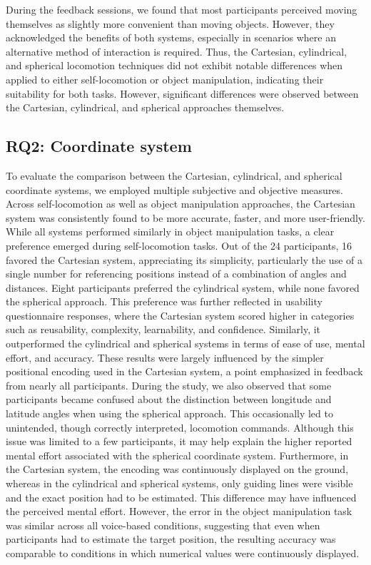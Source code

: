 \documentclass[preprint,12pt]{elsarticle}
\newcommand{\reftext}[1]{{\color{gray}#1}}   %
\begin{document}
\reftext{During the feedback sessions, we found that most participants perceived moving themselves as slightly more convenient than moving objects. However, they acknowledged the benefits of both systems, especially in scenarios where an alternative method of interaction is required. Thus, the Cartesian, cylindrical, and spherical locomotion techniques did not exhibit notable differences when applied to either self-locomotion or object manipulation, indicating their suitability for both tasks. However, significant differences were observed between the Cartesian, cylindrical, and spherical approaches themselves.}

\subsection{RQ2: Coordinate system}
\reftext{To evaluate the comparison between the Cartesian, cylindrical, and spherical coordinate systems, we employed multiple subjective and objective measures. Across self-locomotion as well as object manipulation approaches, the Cartesian system was consistently found to be more accurate, faster, and more user-friendly. While all systems performed similarly in object manipulation tasks, a clear preference emerged during self-locomotion tasks. Out of the 24 participants, 16 favored the Cartesian system, appreciating its simplicity, particularly the use of a single number for referencing positions instead of a combination of angles and distances. Eight participants preferred the cylindrical system, while none favored the spherical approach. This preference was further reflected in usability questionnaire responses, where the Cartesian system scored higher in categories such as reusability, complexity, learnability, and confidence. Similarly, it outperformed the cylindrical and spherical systems in terms of ease of use, mental effort, and accuracy. These results were largely influenced by the simpler positional encoding used in the Cartesian system, a point emphasized in feedback from nearly all participants. During the study, we also observed that some participants became confused about the distinction between longitude and latitude angles when using the spherical approach. This occasionally led to unintended, though correctly interpreted, locomotion commands. Although this issue was limited to a few participants, it may help explain the higher reported mental effort associated with the spherical coordinate system. Furthermore, in the Cartesian system, the encoding was continuously displayed on the ground, whereas in the cylindrical and spherical systems, only guiding lines were visible and the exact position had to be estimated. This difference may have influenced the perceived mental effort. However, the error in the object manipulation task was similar across all voice-based conditions, suggesting that even when participants had to estimate the target position, the resulting accuracy was comparable to conditions in which numerical values were continuously displayed.}
\end{document}
